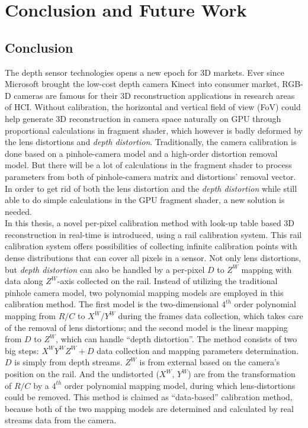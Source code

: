 \chapter{Conclusion and Future Work} %
\label{chapterConclusionAndFutureWork} 

\section{Conclusion}
\indent
The depth sensor technologies opens a new epoch for 3D markets. Ever since Microsoft brought the low-cost depth camera Kinect into consumer market, RGB-D cameras are famous for their 3D reconstruction applications in research areas of HCI. Without calibration, the horizontal and vertical field of view (FoV) could help generate 3D reconstruction in camera space naturally on GPU through proportional calculations in fragment shader, which however is badly deformed by the lens distortions and \emph{depth distortion}. Traditionally, the camera calibration is done based on a pinhole-camera model and a high-order distortion removal model. But there will be a lot of calculations in the fragment shader to process parameters from both of pinhole-camera matrix and distortions' removal vector. In order to get rid of both the lens distortion and the \emph{depth distortion} while still able to do simple calculations in the GPU fragment shader, a new solution is needed.
\\\indent
In this thesis, a novel per-pixel calibration method with look-up table based 3D reconstruction in real-time is introduced, using a rail calibration system. This rail calibration system offers possibilities of collecting infinite calibration points with dense distributions that can cover all pixels in a sensor. Not only lens distortions, but \emph{depth distortion} can also be handled by a per-pixel \(D\) to \(Z^W\) mapping with data along \(Z^W\)-axis collected on the rail. Instead of utilizing the traditional pinhole camera model, two polynomial mapping models are employed in this calibration method. The first model is the two-dimensional \(4^{th}\) order polynomial mapping from \(R/C\) to \(X^W/Y^W\) during the frames data collection, which takes care of the removal of lens distortions; and the second model is the linear mapping from \(D\) to \(Z^W\), which can handle \enquote{depth distortion}. The method consists of two big steps: \(X^WY^WZ^W+D\) data collection and mapping parameters determination. \(D\) is simply from depth streams. \(Z^W\) is from external based on the camera's position on the rail. And the undistorted (\(X^W, \, Y^W\)) are from the transformation of \(R/C\) by a \(4^{th}\) order polynomial mapping model, during which lens-distortions could be removed. This method is claimed as \enquote{data-based} calibration method, because both of the two mapping models are determined and calculated by real streams data from the camera. 
